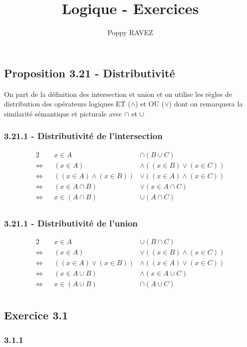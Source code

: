 \documentclass[a4paper,10pt]{report}
\title{Logique - Exercices}
\author{Poppy RAVEZ}
\begin{document}
	
\subsection*{Proposition 3.21 - Distributivité}

On part de la définition des intersection et union et on utilise les règles de distribution
des opérateurs logiques ET ($\wedge$) et OU ($\vee$) dont on remarquera la similarité
sémantique et picturale avec $\cap$ et $\cup$

\subsubsection*{3.21.1 - Distributivité de l'intersection}
\begin{alignat*}{2}
	&                    & x \in A &\cap (B\cup C) \\
	\Longleftrightarrow& & (x \in A) &\wedge ((x \in B) \vee (x \in C)) \\
	\Longleftrightarrow& & ((x \in A) \wedge (x \in B)) &\vee ((x \in A) \wedge (x \in C)) \\
	\Longleftrightarrow& & (x \in A \cap B) &\vee (x \in A\cap C) \\
	\Longleftrightarrow& & x \in (A \cap B) &\cup (A\cap C) \\
\end{alignat*}

\subsubsection*{3.21.1 - Distributivité de l'union}
\begin{alignat*}{2}
	&                    & x \in A &\cup (B\cap C) \\
	\Longleftrightarrow& & (x \in A) &\vee ((x \in B) \wedge (x \in C)) \\
	\Longleftrightarrow& & ((x \in A) \vee (x \in B)) &\wedge ((x \in A) \vee (x \in C)) \\
	\Longleftrightarrow& & (x \in A \cup B) &\wedge (x \in A\cup C) \\
	\Longleftrightarrow& & x \in (A \cup B) &\cap (A\cup C) \\
\end{alignat*}

\subsection*{Exercice 3.1}
\subsubsection*{3.1.1}
\end{document}
